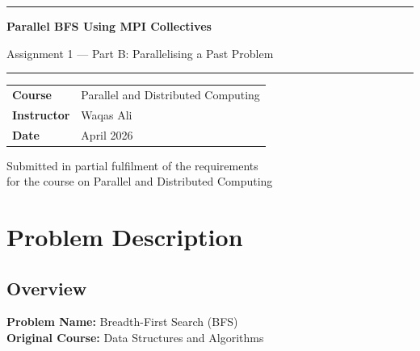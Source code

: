 \documentclass[12pt,a4paper]{article}
\begin{document}
\begin{titlepage}
    \centering
    \vspace*{1.5cm}

    {\color{darkblue}\rule{\linewidth}{1.5pt}}
    \vspace{0.4cm}

    {\color{darkblue}\Huge\bfseries Parallel BFS Using MPI Collectives}

    \vspace{0.3cm}
    {\color{grey}\Large Assignment 1 --- Part B: Parallelising a Past Problem}

    \vspace{0.3cm}
    {\color{darkblue}\rule{\linewidth}{1.5pt}}

    \vspace{1.5cm}

    \begin{tabular}{L{3.5cm} L{7cm}}
        \textbf{\color{darkblue}Course}     & Parallel and Distributed Computing \\
        \textbf{\color{darkblue}Instructor} & Waqas Ali \\
        \textbf{\color{darkblue}Date}       & April 2026 \\
    \end{tabular}

    \vfill

    {\color{grey}\small Submitted in partial fulfilment of the requirements\\
    for the course on Parallel and Distributed Computing}
\end{titlepage}

\tableofcontents
\newpage

\section{Problem Description}

\subsection{Overview}

\textbf{Problem Name:} Breadth-First Search (BFS)\\
\textbf{Original Course:} Data Structures and Algorithms
\end{document}
